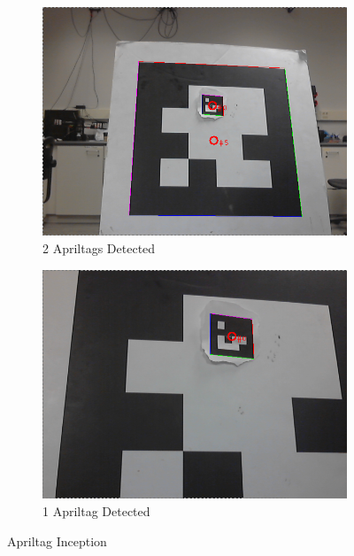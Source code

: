 \documentclass[11pt, twocolumn]{article}
\begin{document}
\begin{figure}[H]
	\centering
	\begin{subfigure}[b]{0.45\linewidth}
		\includegraphics[width=\textwidth]{images/apriltags_1.png}
		\caption{2 Apriltags Detected}
	\end{subfigure}
	\begin{subfigure}[b]{0.45\linewidth}
		\includegraphics[width=\textwidth]{images/apriltags_3.png}
		\caption{1 Apriltag Detected }
	\end{subfigure}
	\caption{Apriltag Inception }
	\label{fig:apriltagInception}
\end{figure}
\end{document}
